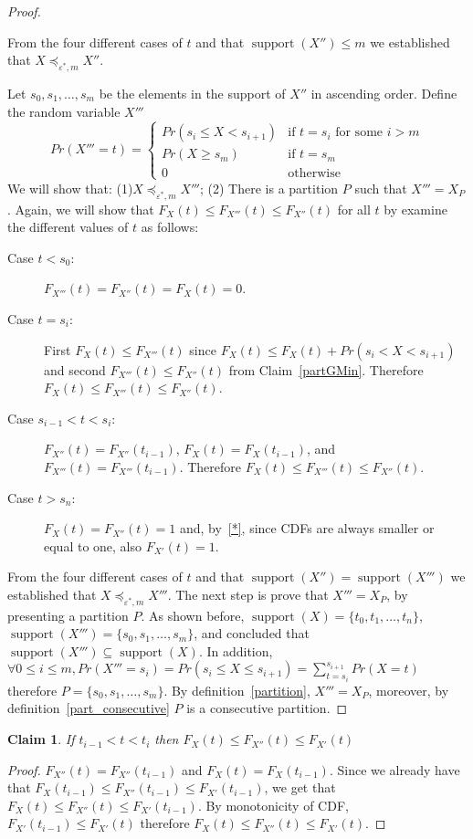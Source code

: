 \documentclass[review]{elsarticle}
\newtheorem{claim}{Claim}
\DeclareMathOperator{\supp}{support}
\DeclareMathOperator{\support}{support}
\begin{document}
\begin{proof}
\begin{description}
\end{description}
From the four different cases of $t$ and that $\supp(X'')\leq m$ we established that $X \preceq_{\varepsilon^*,m} X''$. 

Let $s_0,s_1,\dots,s_m$ be the elements in the support of $X''$ in ascending order. Define the random variable $X'''$
$$
Pr(X'''=t) = \begin{cases}
Pr(s_{i} \leq X < s_{i+1}) & \text{if } t=s_i \text{ for some } i > m \\ 
Pr(X \geq s_m)           & \text{if } t=s_m  \\ 
0                        & \text{otherwise}
\end{cases}
$$
We will show that: (1)$X \preceq_{\varepsilon^*,m} X'''$; (2) There is a partition $P$ such that $X'''=X_P$. 
Again, we will show that $F_{X}(t) \leq  F_{X'''}(t) \leq F_{X''}(t)$ for all $t$ by examine the different values of $t$ as follows: 
\begin{description}
\item[Case $t < s_0$:] $F_{X'''}(t)=F_{X''}(t)=F_{X}(t)=0$. 
\item[Case $t=s_i$:] First $F_{X}(t) \leq F_{X'''}(t)$ since $F_{X}(t) \leq F_{X}(t)+Pr(s_{i} < X < s_{i+1})$ 
and second $F_{X'''}(t) \leq F_{X''}(t)$  from Claim~\ref{partGMin}. Therefore $F_{X}(t) \leq F_{X'''}(t) \leq F_{X''}(t)$.
\item[Case $s_{i-1} < t < s_i$:] $F_{X''}(t)= F_{X''}(t_{i-1})$, $F_{X}(t)=F_{X}(t_{i-1})$, and $F_{X'''}(t)= F_{X'''}(t_{i-1})$. Therefore $F_{X}(t) \leq F_{X'''}(t) \leq F_{X''}(t)$.  
\item[Case $t > s_n$:] $F_{X}(t)= F_{X''}(t)=1$ and, by~\eqref{*}, since CDFs are always smaller or equal to one, also $F_{X'}(t)=1$.
\end{description}
From the four different cases of $t$ and that $\supp(X'')=\supp(X''')$ we established that $X \preceq_{\varepsilon^*,m} X'''$. 
The next step is prove that $X'''=X_P$, by presenting a partition $P$. As shown before, $\support(X)=\{t_0,t_1,\dots,t_n\}$,  $\support(X''')=\{s_0,s_1,\dots,s_m\}$, and concluded that $\support(X''')\subseteq \support(X)$. In addition, $\forall 0\leq i\leq m, Pr(X'''=s_i) = Pr(s_i \leq X \leq s_{i+1})=\sum^{s_{i+1}}_{t=s_i} Pr(X=t)$ therefore $P = \{s_0,s_1,\dots,s_m\}$.
By definition~\ref{partition}, $X'''=X_P$, moreover, by definition~\ref{part_consecutive} $P$ is a consecutive partition.
\end{proof}
\begin{claim}\label{suppGMin}
If $t_{i-1} < t < t_i$ then $F_{X}(t) \leq F_{X''}(t) \leq F_{X'}(t)$
\end{claim}
\begin{proof}
$F_{X''}(t)= F_{X''}(t_{i-1})$ and $F_{X}(t)=F_{X}(t_{i-1})$. Since we already have that $F_{X}(t_{i-1}) \leq F_{X''}(t_{i-1}) \leq F_{X'}(t_{i-1})$, we get that $F_{X}(t) \leq F_{X''}(t) \leq F_{X'}(t_{i-1})$. By monotonicity of CDF, $F_{X'}(t_{i-1}) \leq F_{X'}(t)$ therefore $F_{X}(t) \leq F_{X''}(t) \leq F_{X'}(t)$.
\end{proof}
\end{document}
